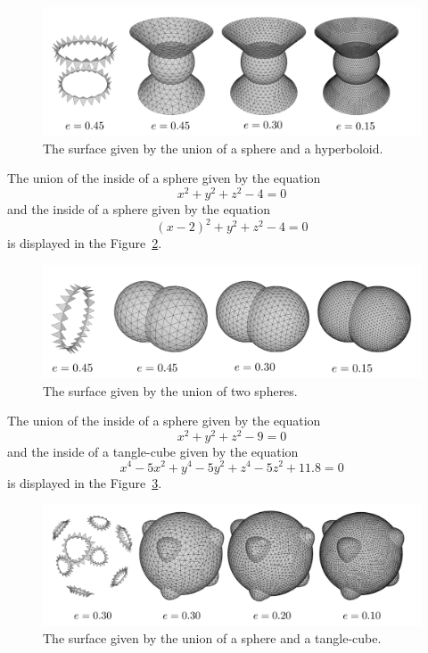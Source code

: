 \begin{figure}[h!]
    \centerline{\includegraphics[scale=0.5]{images/img77}}
    \caption[The surface given by the union of a sphere and a hyperboloid]
    {The surface given by the union of a sphere and a hyperboloid.}
    \label{img:77}
\end{figure}

The union of the inside of a sphere given by the equation
$$x^2+y^2+z^2-4=0$$ and the inside of a sphere given by the 
equation $$(x-2)^2+y^2+z^2-4=0$$ is displayed in the Figure~\ref{img:78}.

\begin{figure}[h!]
    \centerline{\includegraphics[scale=0.5]{images/img78}}
    \caption[The surface given by the union of two spheres]
    {The surface given by the union of two spheres.}
    \label{img:78}
\end{figure}

The union of the inside of a sphere given by the equation
$$x^2+y^2+z^2-9=0$$ and the inside of a tangle-cube given by the 
equation $$x^4-5x^2+y^4-5y^2+z^4-5z^2+11.8=0$$ is displayed in the Figure~\ref{img:79}.

\begin{figure}[h!]
    \centerline{\includegraphics[scale=0.5]{images/img79}}
    \caption[The surface given by the union of a sphere and a tangle-cube]
    {The surface given by the union of a sphere and a tangle-cube.}
    \label{img:79}
\end{figure}

